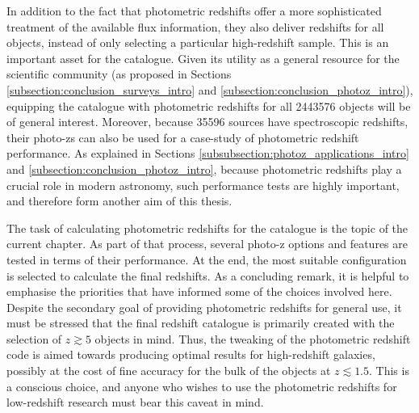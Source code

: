 
In addition to the fact that photometric redshifts offer a more sophisticated treatment of the available flux information, they also deliver redshifts for all objects, instead of only selecting a particular high-redshift sample. This is an important asset for the \DESVIDEO catalogue. Given its utility as a general resource for the scientific community (as proposed in Sections \ref{subsection:conclusion_surveys_intro} and \ref{subsection:conclusion_photoz_intro}), equipping the \DESVIDEO catalogue with photometric redshifts for all \num{2443576} objects will be of general interest. Moreover, because \num{35596} sources have spectroscopic redshifts, their photo-zs can also be used for a case-study of photometric redshift performance. As explained in Sections \ref{subsubsection:photoz_applications_intro} and \ref{subsection:conclusion_photoz_intro}, because photometric redshifts play a crucial role in modern astronomy, such performance tests are highly important, and therefore form another aim of this thesis.\par


The task of calculating photometric redshifts for the \DESVIDEO catalogue is the topic of the current chapter. As part of that process, several photo-z options and features are tested in terms of their performance. At the end, the most suitable configuration is selected to calculate the final \DESVIDEO redshifts. As a concluding remark, it is helpful to emphasise the priorities that have informed some of the choices involved here. Despite the secondary goal of providing photometric redshifts for general use, it must be stressed that the final \DESVIDEO redshift catalogue is primarily created with the selection of $z\gtrsim5$ objects in mind. Thus, the tweaking of the photometric redshift code is aimed towards producing optimal results for high-redshift galaxies, possibly at the cost of fine accuracy for the bulk of the objects at $z\lesssim1.5$. This is a conscious choice, and anyone who wishes to use the photometric redshifts for low-redshift research must bear this caveat in mind.\par




